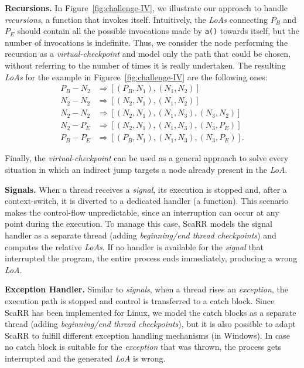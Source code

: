 \textbf{Recursions.}
In Figure~\ref{fig:challenge-IV}, we illustrate our approach to handle 
\emph{recursions},
\ie a function that invokes itself. 
%
Intuitively, the \emph{LoAs} connecting \texttt{$P_B$} and \texttt{$P_E$} 
should contain all the possible invocations made by \texttt{a()} towards 
itself, but the number of invocations is indefinite. Thus, we consider the node 
performing the recursion as a \emph{virtual-checkpoint} and model only the path 
that could be chosen, without referring to the number of times it is really 
undertaken. The resulting \emph{LoAs} for the example in 
Figuree~\ref{fig:challenge-IV} are the following ones: 
\begin{equation*}
\begin{split}
P_B-N_2 &\Rightarrow [(P_B, N_1),(N_1,N_2)] \\    
N_2-N_2 &\Rightarrow [(N_2, N_1),(N_1,N_2)] \\ 
N_2-N_2 &\Rightarrow [(N_2, N_1),(N_1, N_3),(N_3, N_2)] \\
N_2-P_E &\Rightarrow [(N_2, N_1),(N_1, N_3),(N_3, P_E)] \\
P_B-P_E &\Rightarrow [(P_B, N_1),(N_1, N_3),(N_3, P_E)].
\end{split}
\end{equation*}

Finally, the \emph{virtual-checkpoint} can be used as a general approach to 
solve every situation in which an indirect jump targets a node already present 
in the \emph{LoA}.

\textbf{Signals.}
When a thread receives a \emph{signal}, its execution is stopped and, after a 
context-switch, it is diverted to a dedicated handler (\eg a function).
This scenario makes the control-flow unpredictable, since an interruption can 
occur at any point during the execution. To manage this case, ScaRR models the 
signal handler as a separate thread (adding \emph{beginning/end thread 
checkpoints})
and computes the relative \emph{LoAs}. If no handler is available for the 
\emph{signal} that interrupted the program, the entire process ends 
immediately, producing a wrong \emph{LoA}. 

\textbf{Exception Handler.}
Similar to \emph{signals}, when a thread rises an \emph{exception}, the 
execution path is stopped
and control is transferred to a catch block. 
Since ScaRR has been implemented for Linux,
we model the catch blocks as a separate thread (adding \emph{beginning/end 
thread checkpoints}),
but it is also possible to adapt ScaRR to fulfill different exception handling 
mechanisms (\eg in Windows).
In case no catch block is suitable for the \emph{exception} that was thrown, 
the process gets interrupted and the generated \emph{LoA} is wrong.


